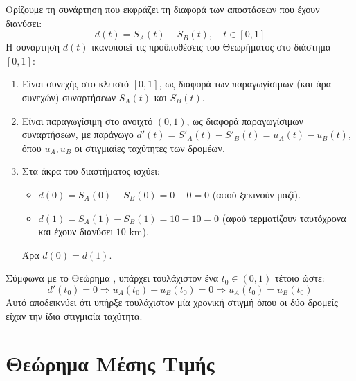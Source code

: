 \lysh
Ορίζουμε τη συνάρτηση που εκφράζει τη διαφορά των αποστάσεων που έχουν διανύσει: 
\[ d(t) = S_A(t) - S_B(t), \quad t \in [0, 1] \]
Η συνάρτηση $d(t)$ ικανοποιεί τις προϋποθέσεις του Θεωρήματος  στο διάστημα $[0, 1]$:
\begin{enumerate}
\item Είναι συνεχής στο κλειστό $[0, 1]$, ως διαφορά των παραγωγίσιμων (και άρα συνεχών) συναρτήσεων $S_A(t)$ και $S_B(t)$.
\item Είναι παραγωγίσιμη στο ανοιχτό $(0, 1)$, ως διαφορά παραγωγίσιμων συναρτήσεων, με παράγωγο $d'(t) = S'_A(t) - S'_B(t) = u_A(t) - u_B(t)$, όπου $u_A, u_B$ οι στιγμιαίες ταχύτητες των δρομέων.
\item Στα άκρα του διαστήματος ισχύει:
  \begin{itemize}
  \item $d(0) = S_A(0) - S_B(0) = 0 - 0 = 0$ (αφού ξεκινούν μαζί).
  \item $d(1) = S_A(1) - S_B(1) = 10 - 10 = 0$ (αφού τερματίζουν ταυτόχρονα και έχουν διανύσει $10$ \si{km}).
  \end{itemize}
  Άρα $d(0) = d(1)$.
\end{enumerate}
Σύμφωνα με το Θεώρημα , υπάρχει τουλάχιστον ένα $t_0 \in (0, 1)$ τέτοιο ώστε:
\[ d'(t_0) = 0 \Rightarrow u_A(t_0) - u_B(t_0) = 0 \Rightarrow u_A(t_0) = u_B(t_0) \]
Αυτό αποδεικνύει ότι υπήρξε τουλάχιστον μία χρονική στιγμή όπου οι δύο δρομείς είχαν την ίδια στιγμιαία ταχύτητα.

\section{Θεώρημα Μέσης Τιμής}


